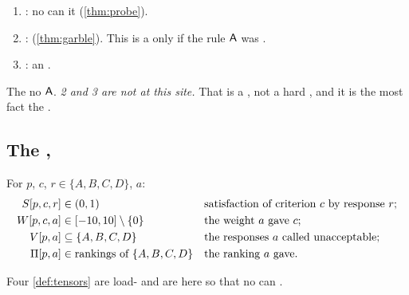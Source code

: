 \begin{remark}
\label{rem:threelosses}
\begin{enumerate}
\item \textbf{ }: no  can  it (\cref{thm:probe}).
\item \textbf{  }:   
        (\cref{thm:garble}). This is a \emph{} only if
      the rule $\mathsf{A}$ was  .
\item \textbf{ }: an  .
\end{enumerate}
The    no $\mathsf{A}$. \emph{  2 and 3 are
not  at this site.} That is a  , not a hard 
, and it is the  most  fact  the .
\end{remark}

\subsection{The , }

\begin{definition}
\label{def:tensors}
For  $p$,   $c$,   $r \in \{A,B,C,D\}$,
 $a$:
\begin{align*}
S[p,c,r] &\in (0,1) && \text{satisfaction of criterion } c \text{ by response } r;\\
W[p,c,a] &\in [-10,10]\setminus\{0\} && \text{the weight } a \text{ gave } c;\\
V[p,a] &\subseteq \{A,B,C,D\} && \text{the responses } a \text{ called unacceptable};\\
\Pi[p,a] &\in \text{rankings of } \{A,B,C,D\} && \text{the ranking } a \text{ gave.}
\end{align*}
\end{definition}

Four   \cref{def:tensors} are load- and are  here so that
no   can  .


